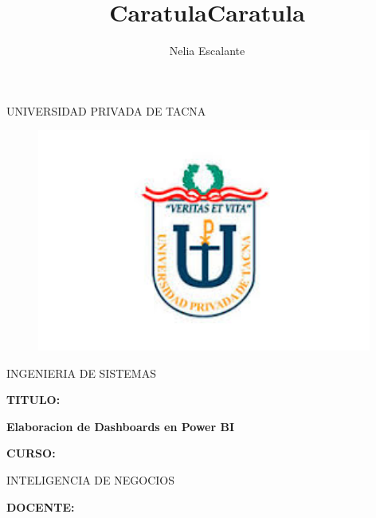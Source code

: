 \documentclass[12pt,letterpaper]{article}
\author{Nelia Escalante}
\title{Caratula}
\begin{document}
\title{Caratula}

\begin{titlepage}
\begin{center}
\large{UNIVERSIDAD PRIVADA DE TACNA}\\
\vspace*{-0.025in}
\begin{figure}[htb]
\begin{center}
\includegraphics[width=11cm]{./IMG/logo}
\end{center}
\end{figure}
\Large INGENIERIA DE SISTEMAS  \\

\vspace*{0.5in}
\begin{large}
\textbf{TITULO:} \\
\end{large}

\vspace*{0.1in}
\begin{Large}
\textbf{Elaboracion de Dashboards en Power BI} \\
\end{Large}

\vspace*{0.3in}
\begin{Large}
\textbf{CURSO:} \\
\end{Large}

\vspace*{0.1in}
\begin{large}
INTELIGENCIA DE NEGOCIOS\\
\end{large}

\vspace*{0.3in}
\begin{Large}
\textbf{DOCENTE:} \\
\end{Large}


\end{center}
\end{titlepage}
\end{document}
